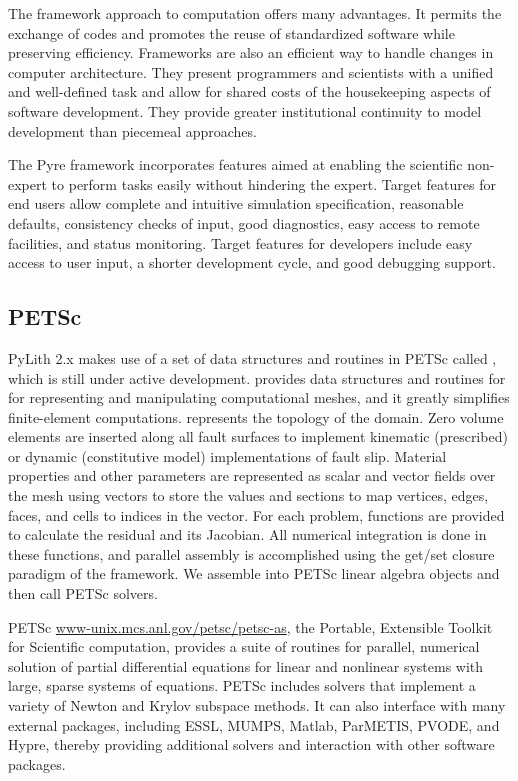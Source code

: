 The framework approach to computation offers many advantages. It permits
the exchange of codes and promotes the reuse of standardized software
while preserving efficiency. Frameworks are also an efficient way
to handle changes in computer architecture. They present programmers
and scientists with a unified and well-defined task and allow for
shared costs of the housekeeping aspects of software development.
They provide greater institutional continuity to model development
than piecemeal approaches.

The Pyre framework incorporates features aimed at enabling the
scientific non-expert to perform tasks easily without hindering the
expert. Target features for end users allow complete and intuitive
simulation specification, reasonable defaults, consistency checks of
input, good diagnostics, easy access to remote facilities, and status
monitoring. Target features for developers include easy access to user
input, a shorter development cycle, and good debugging support.


\subsection{PETSc}

PyLith 2.x makes use of a set of data structures and routines in PETSc
called , which is still under active
development.  provides data structures and routines for
for representing and manipulating computational meshes, and it greatly
simplifies finite-element computations. represents the
topology of the domain. Zero volume elements are inserted along all
fault surfaces to implement kinematic (prescribed) or dynamic
(constitutive model) implementations of fault slip. Material
properties and other parameters are represented as scalar and vector
fields over the mesh using vectors to store the values and sections to
map vertices, edges, faces, and cells to indices in the vector. For
each problem, functions are provided to calculate the residual and its
Jacobian.  All numerical integration is done in these functions, and
parallel assembly is accomplished using the get/set closure paradigm
of the  framework. We assemble into PETSc linear
algebra objects and then call PETSc solvers.

PETSc \url{www-unix.mcs.anl.gov/petsc/petsc-as}, the Portable,
Extensible Toolkit for Scientific computation, provides a suite of
routines for parallel, numerical solution of partial differential
equations for linear and nonlinear systems with large, sparse systems
of equations.  PETSc includes solvers that implement a variety of
Newton and Krylov subspace methods. It can also interface with many
external packages, including ESSL, MUMPS, Matlab, ParMETIS, PVODE, and
Hypre, thereby providing additional solvers and interaction with other
software packages.

